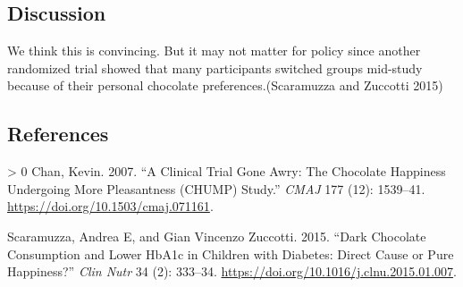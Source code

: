 \documentclass[
]{article}
\newlength{\cslhangindent}
\newenvironment{CSLReferences}[3] %
 {%
  \setlength{\parindent}{0pt}
  \ifodd #1 \everypar{\setlength{\hangindent}{\cslhangindent}}\ignorespaces\fi
  \ifnum #2 > 0
  \setlength{\parskip}{#2\baselineskip}
  \fi
 }%
 {}
\begin{document}
\hypertarget{discussion}{%
\subsection{Discussion}\label{discussion}}

We think this is convincing. But it may not matter for policy since
another randomized trial showed that many participants switched groups
mid-study because of their personal chocolate preferences.(Scaramuzza
and Zuccotti 2015)

\hypertarget{references}{%
\subsection*{References}\label{references}}

\hypertarget{refs}{}
\begin{CSLReferences}{1}{0}
\leavevmode\hypertarget{ref-Chan:2007th}{}%
Chan, Kevin. 2007. {``A Clinical Trial Gone Awry: The {Chocolate
Happiness Undergoing More Pleasantness (CHUMP)} Study.''} \emph{CMAJ}
177 (12): 1539--41. \url{https://doi.org/10.1503/cmaj.071161}.

\leavevmode\hypertarget{ref-Scaramuzza:2015fy}{}%
Scaramuzza, Andrea E, and Gian Vincenzo Zuccotti. 2015. {``Dark
Chocolate Consumption and Lower {HbA1c} in Children with Diabetes:
Direct Cause or Pure Happiness?''} \emph{Clin Nutr} 34 (2): 333--34.
\url{https://doi.org/10.1016/j.clnu.2015.01.007}.

\end{CSLReferences}
\end{document}
